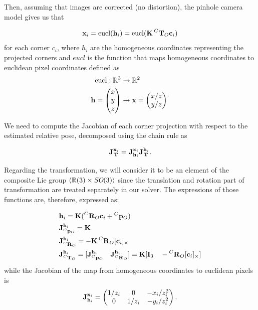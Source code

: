 Then, assuming that images are corrected (no distortion), the pinhole camera model gives us that

\begin{equation}
    {\bf x}_i = \text{eucl}({\bf h}_i) = \text{eucl}({\bf K}\prescript{C}{}{{\bf T}}_{O} {\bf c}_i)
\end{equation}
%
for each corner $c_i$, where $h_i$ are the homogeneous coordinates representing the projected corners and $eucl$ is the function that maps 
homogeneous coordinates to euclidean pixel coordinates defined as
%
\begin{equation}
    \begin{split}
        \text{eucl}: \mathbb{R}^3 
        &\rightarrow \mathbb{R}^2 \\
        {\bf h} = \begin{pmatrix}x\\y\\z\end{pmatrix} 
        &\rightarrow {\bf x} = \begin{pmatrix}x/z\\y/z\end{pmatrix}
    \end{split}.
\end{equation}

We need to compute the Jacobian of each corner projection with respect to the estimated relative pose, decomposed using the chain rule as  

\begin{equation}
    {\bf J}^{{\bf x}_i}_{\prescript{}{}{{\bf T}}_{}} = {\bf J}^{{\bf x}_i}_{{\bf h}_i} {\bf J}^{{\bf h}_i}_{\prescript{}{}{{\bf T}}_{}}.   
\end{equation}

Regarding the transformation, we will consider it to be an element of the composite Lie group $\left<\mathbb{R}(3)\times \textit{SO}(3)\right>$ since the translation and rotation part 
of transformation are treated separately in our solver. The expressions of those functions are, therefore, expressed as:

\begin{equation}
    \begin{split}
        &{\bf h}_i = {\bf K}(\prescript{C}{}{{\bf R}}_{O}{\bf c}_i + \prescript{C}{}{{\bf p}}_{O}) \\
        &{\bf J}^{{\bf h}_i}_{\prescript{C}{}{{\bf p}}_{O}} = {\bf K} ~~~~~~ \\ &{\bf J}^{{\bf h}_i}_{\prescript{C}{}{{\bf R}}_{O}} = -{\bf K}\prescript{C}{}{{\bf R}}_{O}[{\bf c}_i]_{\times}  \\  
        &{\bf J}^{{\bf h}_i}_{\prescript{C}{}{{\bf T}}_{O}} = [{\bf J}^{{\bf h}_i}_{\prescript{C}{}{{\bf p}}_{O}} ~~~ {\bf J}^{{\bf h}_i}_{\prescript{C}{}{{\bf R}}_{O}}] = {\bf K} [{\bf I}_3 ~~~ -\prescript{C}{}{{\bf R}}_{O} [{\bf c}_i]_{\times}]
    \end{split}
\end{equation}
%
while the Jacobian of the map from homogeneous coordinates to euclidean pixels is
\begin{equation}
    {\bf J}^{{\bf x}_i}_{{\bf h}_i}
    =
    \begin{pmatrix}
    1/z_i & 0 & -x_i/z_i^2 \\
    0 & 1/z_i & -y_i/z_i^2
    \end{pmatrix}.
\end{equation}

